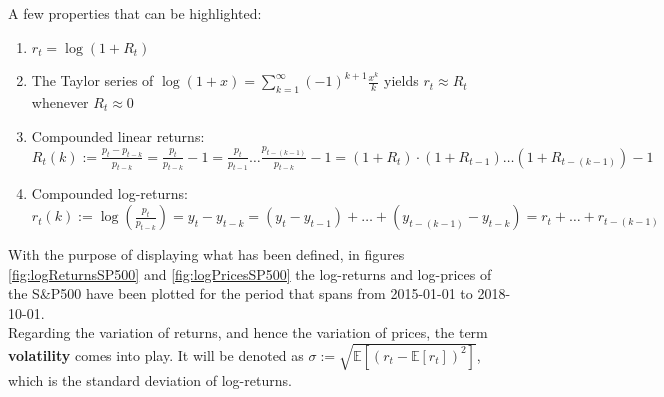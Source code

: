 A few properties that can be highlighted:
\begin{enumerate}
	\item $r_t = \log (1 + R_t)$
	
	\item The Taylor series of $\log (1 + x) = \sum_{k = 1}^{\infty} 
	(-1)^{k + 1} \frac{x^k}{k}$ yields $r_t \approx R_t$ 	whenever 
	$R_t \approx 0$
	
	\item Compounded linear returns:\\
	$R_t(k) := \frac{p_t - p_{t-k}}{p_{t-k}} = \frac{p_t}{p_{t-k}} - 1 = 
	\frac{p_t}{p_{t-1}} \ldots \frac{p_{t-(k-1)}}{p_{t-k}} - 1 = 
	(1 + R_t) \cdot 	(1 + R_{t-1}) \ldots (1 + R_{t-(k-1)}) - 1$
	
	\item Compounded log-returns:\\
	$r_t(k) := \log \left( \frac{p_t}{p_{t-k}} \right) = y_t - y_{t-k} = 
	(y_t - y_{t-1}) + \ldots + (y_{t-(k-1)} - y_{t-k}) = 
	r_t + \ldots + r_{t-(k-1)}$
\end{enumerate}

\vspace{.2cm}

With the purpose of displaying what has been defined, in figures 
\ref{fig:logReturnsSP500} and \ref{fig:logPricesSP500} the log-returns and 
log-prices of the S\&P500 have been plotted for the period that spans from 
2015-01-01 to 2018-10-01.\\

Regarding the variation of returns, and hence the variation of prices, the 
term \textbf{volatility} comes into play. It will be denoted as 
$\sigma := \sqrt{ \mathbb{E} [ (r_t - \mathbb{E} [r_t] )^2 ] }$, 
which is the standard deviation of log-returns.

